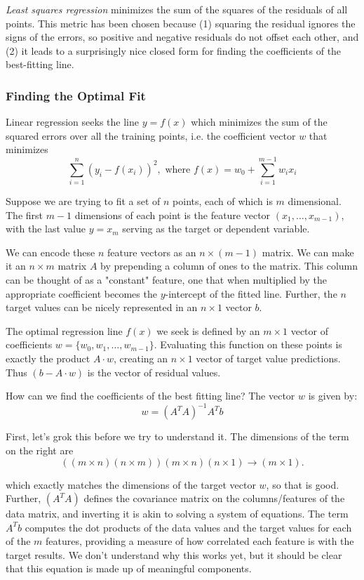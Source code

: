 \documentclass[10pt]{article}
\begin{document}
\textit{Least squares regression} minimizes the sum of the squares of the residuals of all points. This metric has been chosen because (1) squaring the residual ignores the signs of the errors, so positive and negative residuals do not offset each other, and (2) it leads to a surprisingly nice closed form for finding the coefficients of the best-fitting line.

\subsubsection{Finding the Optimal Fit}
Linear regression seeks the line $y=f(x)$ which minimizes the sum of the squared errors over all the training points, i.e. the coefficient vector $w$ that minimizes
\[
\sum_{i=1}^{n}\left(y_{i}-f\left(x_{i}\right)\right)^{2}, \text{ where } f(x)=w_{0}+\sum_{i=1}^{m-1} w_{i} x_{i}
\]

Suppose we are trying to fit a set of $n$ points, each of which is $m$ dimensional. The first $m-1$ dimensions of each point is the feature vector $\left(x_{1}, \ldots, x_{m-1}\right)$, with the last value $y=x_{m}$ serving as the target or dependent variable.

We can encode these $n$ feature vectors as an $n \times(m-1)$ matrix. We can make it an $n \times m$ matrix $A$ by prepending a column of ones to the matrix. This column can be thought of as a "constant" feature, one that when multiplied by the appropriate coefficient becomes the $y$-intercept of the fitted line. Further, the $n$ target values can be nicely represented in an $n \times 1$ vector $b$.

The optimal regression line $f(x)$ we seek is defined by an $m \times 1$ vector of coefficients $w=\{w_{0}, w_{1}, \ldots, w_{m-1} \}$. Evaluating this function on these points is exactly the product $A \cdot w$, creating an $n \times 1$ vector of target value predictions. Thus $(b-A \cdot w)$ is the vector of residual values.

How can we find the coefficients of the best fitting line? The vector $w$ is given by:
\[
w=\left(A^{T} A\right)^{-1} A^{T} b
\]

First, let's grok this before we try to understand it. The dimensions of the term on the right are
\[
((m \times n)(n \times m))(m \times n)(n \times 1) \rightarrow (m \times 1).
\]

which exactly matches the dimensions of the target vector $w$, so that is good. Further, $\left(A^{T} A\right)$ defines the covariance matrix on the columns/features of the data matrix, and inverting it is akin to solving a system of equations. The term $A^{T} b$ computes the dot products of the data values and the target values for each of the $m$ features, providing a measure of how correlated each feature is with the target results. We don't understand why this works yet, but it should be clear that this equation is made up of meaningful components.
\end{document}
